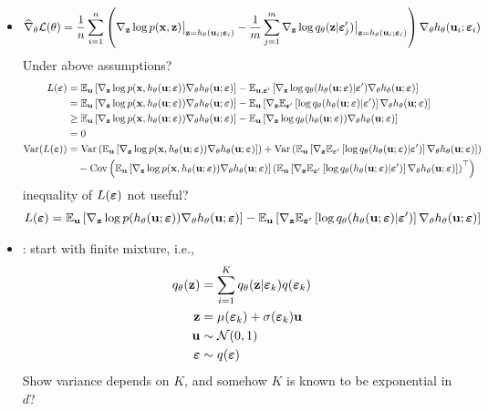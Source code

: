 \documentclass[10pt]{article}
\begin{document}
\begin{itemize}
\item
\[
\widehat{\nabla}_\theta\mathcal{L}(\theta) = \frac{1}{n}\sum_{i=1}^n \left(\nabla_{\mathbf{z}}\log p(\mathbf{x},\mathbf{z})\big|_{\mathbf{z}=h_\theta(\mathbf{u}_i;\bm{\varepsilon}_i)} - \frac{1}{m}\sum_{j=1}^m \nabla_{\mathbf{z}}\log q_\theta(\mathbf{z}|\bm{\varepsilon}_j')\big|_{\mathbf{z}=h_\theta(\mathbf{u}_i;\bm{\varepsilon}_i)} \right)\nabla_\theta h_\theta(\mathbf{u}_i;\bm{\varepsilon}_i)
\]
\todo Under above assumptions?
\begin{align*}
L(\bm{\varepsilon}) &= \mathbb{E}_{\mathbf{u}}\left[\nabla_{\mathbf{z}}\log p(\mathbf{x},h_\theta(\mathbf{u};\bm{\varepsilon}))\nabla_\theta h_\theta(\mathbf{u};\bm{\varepsilon})\right] - \mathbb{E}_{\mathbf{u},\bm{\varepsilon}'}\left[\nabla_{\mathbf{z}}\log q_\theta(h_\theta(\mathbf{u};\bm{\varepsilon})|\bm{\varepsilon}') \nabla_\theta h_\theta(\mathbf{u};\bm{\varepsilon})\right] \\
&= \mathbb{E}_{\mathbf{u}}\left[\nabla_{\mathbf{z}}\log p(\mathbf{x},h_\theta(\mathbf{u};\bm{\varepsilon}))\nabla_\theta h_\theta(\mathbf{u};\bm{\varepsilon})\right] - \mathbb{E}_{\mathbf{u}}\left[\nabla_{\mathbf{z}}\mathbb{E}_{\bm{\varepsilon}'}\left[\log q_\theta(h_\theta(\mathbf{u};\bm{\varepsilon})|\bm{\varepsilon}')\right] \nabla_\theta h_\theta(\mathbf{u};\bm{\varepsilon})\right] \\
&\geq \mathbb{E}_{\mathbf{u}}\left[\nabla_{\mathbf{z}}\log p(\mathbf{x},h_\theta(\mathbf{u};\bm{\varepsilon}))\nabla_\theta h_\theta(\mathbf{u};\bm{\varepsilon})\right] - \mathbb{E}_{\mathbf{u}}\left[\nabla_{\mathbf{z}}\log q_\theta(h_\theta(\mathbf{u};\bm{\varepsilon})) \nabla_\theta h_\theta(\mathbf{u};\bm{\varepsilon})\right] \\
&= 0 \\
\mathrm{Var}(L(\bm{\varepsilon})) &= \mathrm{Var}\left(\mathbb{E}_{\mathbf{u}}\left[\nabla_{\mathbf{z}}\log p(\mathbf{x},h_\theta(\mathbf{u};\bm{\varepsilon}))\nabla_\theta h_\theta(\mathbf{u};\bm{\varepsilon})\right]\right) + \mathrm{Var}\left(\mathbb{E}_{\mathbf{u}}\left[\nabla_{\mathbf{z}}\mathbb{E}_{\bm{\varepsilon}'}\left[\log q_\theta(h_\theta(\mathbf{u};\bm{\varepsilon})|\bm{\varepsilon}')\right] \nabla_\theta h_\theta(\mathbf{u};\bm{\varepsilon})\right]\right) \\
&\quad - \mathrm{Cov}\left(\mathbb{E}_{\mathbf{u}}\left[\nabla_{\mathbf{z}}\log p(\mathbf{x},h_\theta(\mathbf{u};\bm{\varepsilon}))\nabla_\theta h_\theta(\mathbf{u};\bm{\varepsilon})\right]\left(\mathbb{E}_{\mathbf{u}}\left[\nabla_{\mathbf{z}}\mathbb{E}_{\bm{\varepsilon}'}\left[\log q_\theta(h_\theta(\mathbf{u};\bm{\varepsilon})|\bm{\varepsilon}')\right]\nabla_\theta h_\theta(\mathbf{u};\bm{\varepsilon})\right]\right)^\top\right)
\end{align*}
\todo inequality of $L(\bm{\varepsilon})$ not useful?
\begin{align*}
L(\bm{\varepsilon}) &= \mathbb{E}_{\mathbf{u}}\left[\nabla_{\mathbf{z}}\log p(h_\theta(\mathbf{u};\bm{\varepsilon}))\nabla_\theta h_\theta(\mathbf{u};\bm{\varepsilon})\right] - \mathbb{E}_{\mathbf{u}}\left[\nabla_{\mathbf{z}}\mathbb{E}_{\bm{\varepsilon}'}\left[\log q_\theta(h_\theta(\mathbf{u};\bm{\varepsilon})|\bm{\varepsilon}')\right] \nabla_\theta h_\theta(\mathbf{u};\bm{\varepsilon})\right] \\
\end{align*}

\item
\todo: start with finite mixture, i.e.,
\begin{align*}
q_\theta(\mathbf{z}) &= \sum_{i=1}^Kq_\theta(\mathbf{z}|\bm{\varepsilon}_k)q(\bm{\varepsilon}_k) \\
\mathbf{z} &= \mu(\bm{\varepsilon}_k) + \sigma(\bm{\varepsilon}_k)\mathbf{u} \\
\mathbf{u} &\sim \mathcal{N}(0,1) \\
\bm{\varepsilon} &\sim q(\bm{\varepsilon})
\end{align*}
Show variance depends on $K$, and somehow $K$ is known to be exponential in $d$?


\end{itemize}
\end{document}
